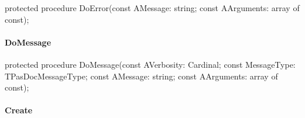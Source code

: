 \documentclass{report}
\newif\ifpdf
\begin{document}
\label{PasDoc_Scanner.TScanner-DoError}
\begin{list}{}{
\setlength{\itemindent}{0cm}
\setlength{\listparindent}{0cm}
\setlength{\leftmargin}{\evensidemargin}
\addtolength{\leftmargin}{\tmplength}
\settowidth{\labelsep}{X}
\addtolength{\leftmargin}{\labelsep}
\setlength{\labelwidth}{\tmplength}
}
\item[\textbf{Declaration}\hfill]
\ifpdf
\begin{flushleft}
\fi
\begin{ttfamily}
protected procedure DoError(const AMessage: string; const AArguments: array of const);\end{ttfamily}

\ifpdf
\end{flushleft}
\fi

\end{list}
\paragraph*{DoMessage}\hspace*{\fill}

\label{PasDoc_Scanner.TScanner-DoMessage}
\begin{list}{}{
\setlength{\itemindent}{0cm}
\setlength{\listparindent}{0cm}
\setlength{\leftmargin}{\evensidemargin}
\addtolength{\leftmargin}{\tmplength}
\settowidth{\labelsep}{X}
\addtolength{\leftmargin}{\labelsep}
\setlength{\labelwidth}{\tmplength}
}
\item[\textbf{Declaration}\hfill]
\ifpdf
\begin{flushleft}
\fi
\begin{ttfamily}
protected procedure DoMessage(const AVerbosity: Cardinal; const MessageType: TPasDocMessageType; const AMessage: string; const AArguments: array of const);\end{ttfamily}

\ifpdf
\end{flushleft}
\fi

\end{list}
\paragraph*{Create}\hspace*{\fill}
\end{document}
